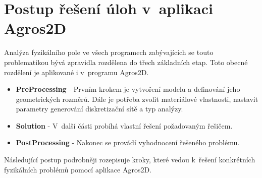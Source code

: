 
\chapter{Postup řešení úloh v~aplikaci Agros2D}  \label{kap:tutorial}
Analýza fyzikálního pole ve všech programech zabývajících se touto problematikou bývá zpravidla rozdělena do třech základních etap. Toto obecné rozdělení je aplikované i v~programu Agros2D.
\begin{itemize}
\item {\bf PreProcessing} - Prvním krokem je vytvoření modelu a definování jeho geometrických rozměrů. Dále je potřeba zvolit materiálové vlastnosti, nastavit parametry generování diskretizační sítě a typ analýzy.
\item {\bf Solution} - V~další části probíhá vlastní řešení požadovaným řešičem.
\item {\bf PostProcessing} - Nakonec se provádí vyhodnocení řešeného problému.
\end{itemize}
Následující postup podrobněji rozepisuje kroky, které vedou k~řešení konkrétních fyzikálních problémů pomocí aplikace Agros2D.
